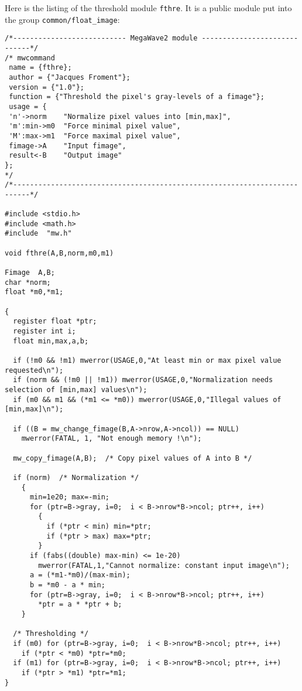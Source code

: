 Here is the listing of the threshold module \verb+fthre+.
It is a public module put into the group \verb+common/float_image+:
{\small
\label{listing_fthre}
\begin{verbatim}
/*--------------------------- MegaWave2 module -----------------------------*/
/* mwcommand
 name = {fthre};
 author = {"Jacques Froment"};
 version = {"1.0"};
 function = {"Threshold the pixel's gray-levels of a fimage"};
 usage = {
 'n'->norm    "Normalize pixel values into [min,max]",
 'm':min->m0  "Force minimal pixel value",
 'M':max->m1  "Force maximal pixel value",
 fimage->A    "Input fimage", 
 result<-B    "Output image"
};
*/
/*--------------------------------------------------------------------------*/

#include <stdio.h>
#include <math.h>
#include  "mw.h"

void fthre(A,B,norm,m0,m1)

Fimage  A,B;
char *norm;
float *m0,*m1;

{
  register float *ptr;
  register int i;
  float min,max,a,b;
  
  if (!m0 && !m1) mwerror(USAGE,0,"At least min or max pixel value requested\n");
  if (norm && (!m0 || !m1)) mwerror(USAGE,0,"Normalization needs selection of [min,max] values\n");
  if (m0 && m1 && (*m1 <= *m0)) mwerror(USAGE,0,"Illegal values of [min,max]\n");

  if ((B = mw_change_fimage(B,A->nrow,A->ncol)) == NULL)
    mwerror(FATAL, 1, "Not enough memory !\n");  
  
  mw_copy_fimage(A,B);  /* Copy pixel values of A into B */

  if (norm)  /* Normalization */
    {
      min=1e20; max=-min;
      for (ptr=B->gray, i=0;  i < B->nrow*B->ncol; ptr++, i++) 
        {
          if (*ptr < min) min=*ptr;
          if (*ptr > max) max=*ptr;
        }
      if (fabs((double) max-min) <= 1e-20)
        mwerror(FATAL,1,"Cannot normalize: constant input image\n");
      a = (*m1-*m0)/(max-min);
      b = *m0 - a * min;
      for (ptr=B->gray, i=0;  i < B->nrow*B->ncol; ptr++, i++) 
        *ptr = a * *ptr + b;
    }

  /* Thresholding */
  if (m0) for (ptr=B->gray, i=0;  i < B->nrow*B->ncol; ptr++, i++)
    if (*ptr < *m0) *ptr=*m0;
  if (m1) for (ptr=B->gray, i=0;  i < B->nrow*B->ncol; ptr++, i++)
    if (*ptr > *m1) *ptr=*m1;
}

\end{verbatim}
}

